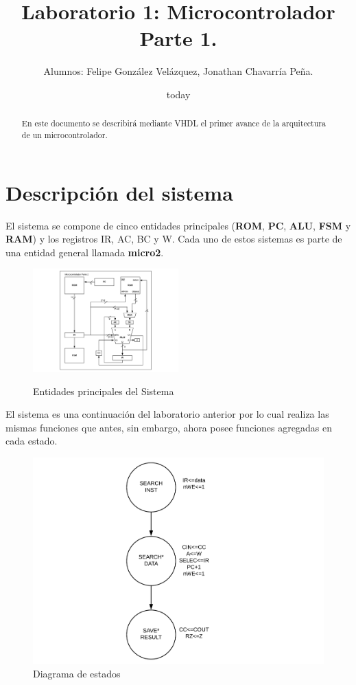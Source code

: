 \documentclass[12pt,letterpapers]{IEEEtran}
\date{today}
\title{Laboratorio 1: Microcontrolador Parte 1.}
\author{Alumnos: Felipe González Velázquez, Jonathan Chavarría Peña.}
\begin{document}
\renewcommand{\leftmark}{UNIVERSIDAD LATINA DE COSTA RICA -- BINGE-57 Arquitectura de Computadores}
\maketitle
	\begin{abstract}
	En este documento se describirá mediante VHDL el primer avance de la arquitectura de un microcontrolador.  
	\end{abstract}
\section{Descripción del sistema}
El sistema se compone de cinco entidades principales (\textbf{ROM}, \textbf{PC}, \textbf{ALU}, \textbf {FSM} y \textbf{RAM}) y los registros IR, AC, BC y W. Cada uno de estos sistemas es parte de una entidad general llamada \textbf{micro2}.

	\begin{figure}[H]
		\centering	
		\includegraphics[width=0.5\textwidth]{graph} 
		\label{graph}
		\caption{Entidades principales del Sistema}
	\end{figure} 

El sistema es una continuación del laboratorio anterior por lo cual realiza las mismas funciones que antes, sin embargo, ahora posee funciones agregadas en cada estado.

\begin{figure}[H]
\centering
\includegraphics[scale=0.5]{graph2.pdf}
\caption{Diagrama de estados}
\end{figure}
\end{document}
